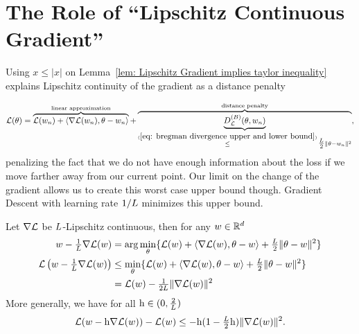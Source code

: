 \section{The Role of ``Lipschitz Continuous Gradient''}

Using \(x\le|x|\) on Lemma~\ref{lem: Lipschitz Gradient implies taylor inequality}
explains Lipschitz continuity of the gradient as a distance penalty

\begin{align}\label{eq: lin approx + distance penalty notion}
	\Loss(\theta)
	= \overbrace{
		\Loss(\weights_n)+ \langle\nabla\Loss(\weights_n), \theta-\weights_n\rangle 
	}^{\text{linear approximation}}
	+ \overbrace{\underbrace{\bregmanDiv{\Loss}(\theta,\weights_n)}_{
		\xle{(\ref{eq: bregman divergence upper and lower bound})}
		\tfrac\ubound{2} \|\theta-\weights_n\|^2 
	}}^{\text{distance penalty}},
\end{align}
%
penalizing the fact that we do not have enough information about the loss if we
move farther away from our current point. Our limit on the change of the gradient
allows us to create this worst case upper bound though.
Gradient Descent with learning rate \(1/L\) minimizes this upper bound.
%
\begin{lemma}\label{lem: smallest upper bound}
	Let \(\nabla \mathcal{L}\) be \(L\)-Lipschitz continuous, then for any \(w\in\mathbb{R}^d\)
	\begin{align}
		w - \tfrac{1}{L}\nabla \mathcal{L}(w) 
		&= \arg\min_{\theta}\{
			\mathcal{L}(w)+ \langle\nabla \mathcal{L}(w), \theta-w\rangle + \tfrac{L}{2}\|\theta-w\|^2 
		\}\\
		\label{eq: min approximation}
		\mathcal{L}\left(w-\tfrac{1}{L}\nabla\mathcal{L}(w)\right)
		&\le \min_{\theta} \{
			\mathcal{L}(w)+ \langle\nabla \mathcal{L}(w), \theta-w\rangle
			+ \tfrac{L}{2}\|\theta-w\|^2 
		\} \\ \nonumber
		&= \mathcal{L}(w) - \tfrac{1}{2L} \|\nabla \mathcal{L}(w)\|^2
	\end{align}
	More generally, we have for all \(\text{h}\in(0, \tfrac{2}{L})\)
	\begin{align*}
		\mathcal{L}(w - \text{h}\nabla\mathcal{L}(w)) - \mathcal{L}(w)
		\le-\text{h}(1-\tfrac{L}2 \text{h})\|\nabla\mathcal{L}(w)\|^2.
	\end{align*}
\end{lemma}
